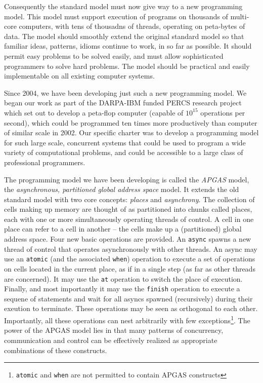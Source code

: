 Consequently the standard model must now give way to a new programming
model. This model must support execution of programs on thousands of
multi-core computers, with tens of thousadns of threads, operating on
peta-bytes of data. The model should smoothly extend the original
standard model so that familiar ideas, patterns, idioms continue to
work, in so far as possible. It should permit easy problems to be
solved easily, and must allow sophisticated programmers to solve hard
problems.  The model should be practical and easily implementable on
all existing computer systems.

Since 2004, we have been developing just such a new programming
model. We began our work as part of the DARPA-IBM funded PERCS
research project which set out to develop a peta-flop computer
(capable of $10^15$ operations per second), which could be programmed
ten times more  productively than computer of similar scale in 2002.
Our specific charter was to develop a programming model for such large
scale, concurrent systems that could be used to program a wide variety
of computational problems, and could be accessible to a large class of
professional programmers.  

The programming model we have been developing is called the {\em
  APGAS} model, the {\em asynchronous, partitioned global address
  space} model. It extends the old standard model with two core
concepts: {\em places} and {\em asynchrony}. The collection of cells
making up memory are thought of as partitioned into chunks called
places, each with one or more simultaneously operating threads of
control. A  cell in one place can refer to a cell in another -- the
cells make up a (partitioned) global address space. Four new basic
operations are provided.  An {\tt async} spawns a new thread of
control that operates asynchronously with other threads.  An async may
use an {\tt atomic} (and the associated {\tt when}) operation to
execute a set of operations on cells located in the current place, as
if in a single step (as far as other threads are concerned). It may
use the {\tt at} operation to switch the place of execution. Finally,
and most importantly it may use the {\tt finish} operation to execute
a sequene of statements and wait for all asyncs spawned (recursively)
during their exeution to terminate.  These operations may be seen as
orthogonal to each other. Importantly, all these operations can nest
arbitrarily with few exceptions\footnote{{\tt atomic} and {\tt when}
  are not permitted to contain APGAS constructs}.  The power of the
APGAS model lies in that many patterns of concurrency, communication
and control can be effectively realized as appropriate combinations of
these constructs.

